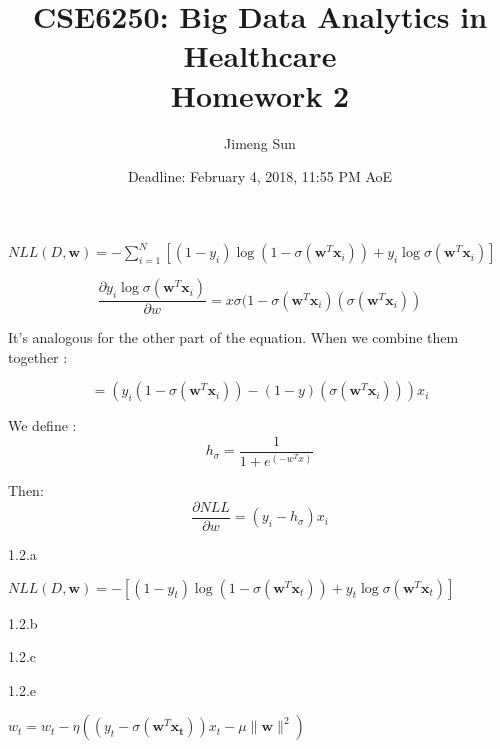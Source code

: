 \documentclass[12pt]{article}
\title{CSE6250: Big Data Analytics in Healthcare \\ Homework 2}
\author{Jimeng Sun}
\date{Deadline: February 4, 2018, 11:55 PM AoE}
\begin{document}
\begin{center}
$NLL\left (D, \mathbf{w} \right ) = -\sum_{i=1}^{N} \left [ \left ( 1 - y_i \right ) \log(1-\sigma(\mathbf{w}^T\mathbf{x}_i)) + y_i\log \sigma(\mathbf{w}^T\mathbf{x}_i)  \right ]$ \end{center}

\begin{equation}
\frac{\partial y_i\log \sigma(\mathbf{w}^T\mathbf{x}_i)}{\partial w} = x\sigma(1-\sigma(\mathbf{w}^T\mathbf{x}_i)(\sigma(\mathbf{w}^T\mathbf{x}_i))
 \end{equation}

It's analogous for the other part of the equation. When we combine them together :

\begin{equation}
= (y_i(1 - \sigma(\mathbf{w}^T\mathbf{x}_i)) - (1 - y)(\sigma(\mathbf{w}^T\mathbf{x}_i)))x_i
 \end{equation}

We define :
\begin{equation}
h_\sigma = \frac{1}{1 + e^(-w^Tx)}
\end{equation}
 
Then:
\begin{equation}
\frac{\partial NLL}{\partial w} = (y_i - h_\sigma)x_i
\end{equation}

1.2.a
\begin{center}

$NLL\left (D, \mathbf{w} \right ) = - \left [ \left ( 1 - y_t \right ) \log(1-\sigma(\mathbf{w}^T\mathbf{x}_t)) + y_t\log \sigma(\mathbf{w}^T\mathbf{x}_t)  \right ]$ \end{center}

1.2.b

1.2.c

1.2.e


\begin{center}
$w_t = w_t - \eta((y_t - \sigma(\mathbf{w}^T\mathbf{x_t}))x_t - \mu \|\mathbf{w}\|^2) $
\end{center}

	
\end{document}
